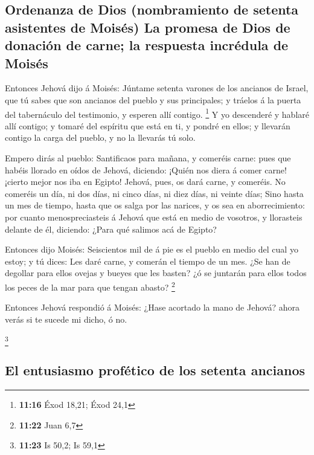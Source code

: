 \hypertarget{ordenanza-de-dios-nombramiento-de-setenta-asistentes-de-moisuxe9s-la-promesa-de-dios-de-donaciuxf3n-de-carne-la-respuesta-incruxe9dula-de-moisuxe9s}{%
\subsection{Ordenanza de Dios (nombramiento de setenta asistentes de
Moisés) La promesa de Dios de donación de carne; la respuesta incrédula
de
Moisés}\label{ordenanza-de-dios-nombramiento-de-setenta-asistentes-de-moisuxe9s-la-promesa-de-dios-de-donaciuxf3n-de-carne-la-respuesta-incruxe9dula-de-moisuxe9s}}

 Entonces Jehová dijo á Moisés: Júntame setenta varones
de los ancianos de Israel, que tú sabes que son ancianos del pueblo y
sus principales; y tráelos á la puerta del tabernáculo del testimonio, y
esperen allí contigo. \footnote{\textbf{11:16} Éxod 18,21; Éxod 24,1}
 Y yo descenderé y hablaré allí contigo; y tomaré del
espíritu que está en ti, y pondré en ellos; y llevarán contigo la carga
del pueblo, y no la llevarás tú solo.

 Empero dirás al pueblo: Santificaos para mañana, y
comeréis carne: pues que habéis llorado en oídos de Jehová, diciendo:
¡Quién nos diera á comer carne! ¡cierto mejor nos iba en Egipto! Jehová,
pues, os dará carne, y comeréis.  No comeréis un día, ni
dos días, ni cinco días, ni diez días, ni veinte días; 
Sino hasta un mes de tiempo, hasta que os salga por las narices, y os
sea en aborrecimiento: por cuanto menospreciasteis á Jehová que está en
medio de vosotros, y llorasteis delante de él, diciendo: ¿Para qué
salimos acá de Egipto?

 Entonces dijo Moisés: Seiscientos mil de á pie es el
pueblo en medio del cual yo estoy; y tú dices: Les daré carne, y comerán
el tiempo de un mes.  ¿Se han de degollar para ellos
ovejas y bueyes que les basten? ¿ó se juntarán para ellos todos los
peces de la mar para que tengan abasto? \footnote{\textbf{11:22} Juan
  6,7}

 Entonces Jehová respondió á Moisés: ¿Hase acortado la
mano de Jehová? ahora verás si te sucede mi dicho, ó no.

\footnote{\textbf{11:23} Is 50,2; Is 59,1}

\hypertarget{el-entusiasmo-profuxe9tico-de-los-setenta-ancianos}{%
\subsection{El entusiasmo profético de los setenta
ancianos}\label{el-entusiasmo-profuxe9tico-de-los-setenta-ancianos}}

